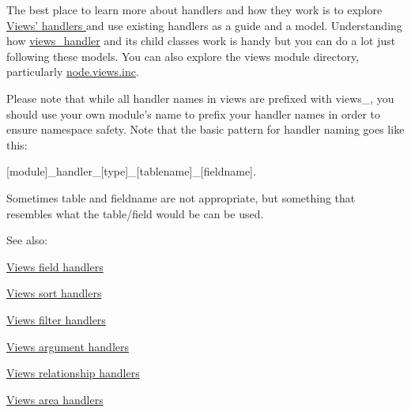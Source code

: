 The best place to learn more about handlers and how they work is to explore \hyperlink{group__views__handlers}{Views' handlers } and use existing handlers as a guide and a model. Understanding how \hyperlink{classviews__handler}{views\_\-handler} and its child classes work is handy but you can do a lot just following these models. You can also explore the views module directory, particularly \hyperlink{node_8views_8inc}{node.views.inc}.

Please note that while all handler names in views are prefixed with views\_\-, you should use your own module's name to prefix your handler names in order to ensure namespace safety. Note that the basic pattern for handler naming goes like this:

\mbox{[}module\mbox{]}\_\-handler\_\-\mbox{[}type\mbox{]}\_\-\mbox{[}tablename\mbox{]}\_\-\mbox{[}fieldname\mbox{]}.

Sometimes table and fieldname are not appropriate, but something that resembles what the table/field would be can be used.

See also:
\begin{DoxyItemize}
\item \hyperlink{group__views__field__handlers}{Views field handlers }
\item \hyperlink{group__views__sort__handlers}{Views sort handlers }
\item \hyperlink{group__views__filter__handlers}{Views filter handlers }
\item \hyperlink{group__views__argument__handlers}{Views argument handlers }
\item \hyperlink{group__views__relationship__handlers}{Views relationship handlers }
\item \hyperlink{group__views__area__handlers}{Views area handlers } 
\end{DoxyItemize}